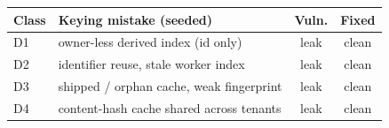 \begin{tabular}{@{}l p{5.0cm} cc@{}}
\toprule
Class & Keying mistake (seeded) & Vuln. & Fixed \\
\midrule
D1 & owner-less derived index (id only)        & leak & clean \\
D2 & identifier reuse, stale worker index       & leak & clean \\
D3 & shipped / orphan cache, weak fingerprint   & leak & clean \\
D4 & content-hash cache shared across tenants   & leak & clean \\
\bottomrule
\end{tabular}

